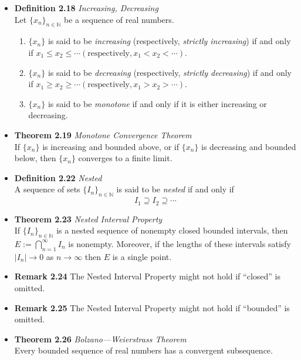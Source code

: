 \documentclass[11pt,a4paper]{article}
\begin{document}
\begin{itemize}
    \item \textbf{Definition 2.18} \emph{Increasing, Decreasing} \\
        Let ${\{x_n\}}_{n \in \mathbb{N}}$ be a sequence of real numbers.
        \begin{enumerate}
            \item $\{x_n\}$ is said to be \emph{increasing}
                (respectively, \emph{strictly increasing}) if and only if
                $x_1 \leq x_2 \leq \cdots (\text{respectively}, x_1 < x_2 < \cdots)$.
            \item $\{x_n\}$ is said to be \emph{decreasing}
                (respectively, \emph{strictly decreasing}) if and only if
                $x_1 \geq x_2 \geq \cdots (\text{respectively}, x_1 > x_2 > \cdots)$.
            \item $\{x_n\}$ is said to be \emph{monotone} if and only if it is either
                increasing or decreasing.
        \end{enumerate}
    \item \textbf{Theorem 2.19} \emph{Monotone Convergence Theorem} \\
        If $\{x_n\}$ is increasing and bounded above, or if $\{x_n\}$ is decreasing and bounded
        below, then $\{x_n\}$ converges to a finite limit.
    \item \textbf{Definition 2.22} \emph{Nested} \\
        A sequence of sets ${\{I_n\}}_{n \in \mathbb{N}}$ is said to be \emph{nested}
        if and only if
        \[
            I_1 \supseteq I_2 \supseteq \cdots
        \]
    \item \textbf{Theorem 2.23} \emph{Nested Interval Property} \\
        If ${\{I_n\}}_{n \in \mathbb{N}}$ is a nested sequence of nonempty closed bounded
        intervals, then $E := \bigcap_{n=1}^\infty I_n$ is nonempty.
        Moreover, if the lengths of these intervals satisfy $|I_n| \to 0$ as $n \to \infty$
        then $E$ is a single point.
    \item \textbf{Remark 2.24}
        The Nested Interval Property might not hold if ``closed'' is omitted.
    \item \textbf{Remark 2.25}
        The Nested Interval Property might not hold if ``bounded'' is omitted.
    \item \textbf{Theorem 2.26} \emph{Bolzano---Weierstrass Theorem} \\
        Every bounded sequence of real numbers has a convergent subsequence.
\end{itemize}
\end{document}
